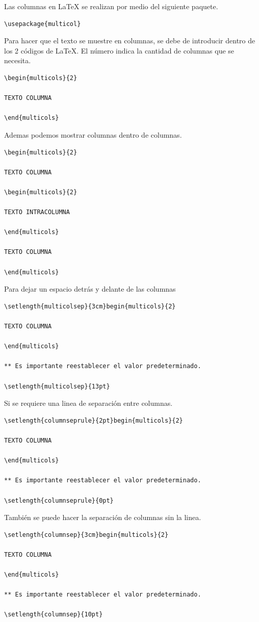 \documentclass[10pt,journal,compsoc]{IEEEtran}
\begin{document}
Las columnas  en {\LaTeX} se realizan por medio del siguiente paquete.
\begin{lstlisting}
\usepackage{multicol}
\end{lstlisting}
Para hacer que el texto se muestre en columnas, se debe de introducir dentro de los 2 c\'odigos de LaTeX. El n\'umero indica la cantidad de columnas que se necesita.
\begin{lstlisting}
\begin{multicols}{2}

TEXTO COLUMNA

\end{multicols}
\end{lstlisting}
Ademas podemos mostrar columnas dentro de columnas.
\begin{lstlisting}
\begin{multicols}{2}

TEXTO COLUMNA

\begin{multicols}{2}

TEXTO INTRACOLUMNA

\end{multicols}

TEXTO COLUMNA

\end{multicols}
\end{lstlisting}
Para dejar un espacio detr\'as y delante de las columnas
\begin{lstlisting}
\setlength{multicolsep}{3cm}begin{multicols}{2}

TEXTO COLUMNA

\end{multicols}

** Es importante reestablecer el valor predeterminado.

\setlength{multicolsep}{13pt}
\end{lstlisting}
Si se requiere una linea de separaci\'on entre columnas.
\begin{lstlisting}
\setlength{columnseprule}{2pt}begin{multicols}{2}

TEXTO COLUMNA

\end{multicols}

** Es importante reestablecer el valor predeterminado.

\setlength{columnseprule}{0pt}
\end{lstlisting}
Tambi\'en se puede hacer la separaci\'on de columnas sin la linea.
\begin{lstlisting}
\setlength{columnsep}{3cm}begin{multicols}{2}

TEXTO COLUMNA

\end{multicols}

** Es importante reestablecer el valor predeterminado.

\setlength{columnsep}{10pt}
\end{lstlisting}
\end{document}
